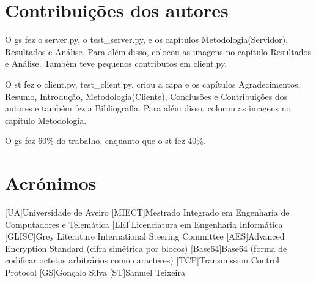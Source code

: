 \documentclass{report}
\begin{document}
\chapter*{Contribuições dos autores}
O \ac{gs} fez o server.py, o test\_server.py, e os capítulos Metodologia(Servidor), Resultados e Análise. Para além disso, colocou as imagens no capítulo Resultados e Análise. Também teve pequenos contributos em client.py.

O \ac{st} fez o client.py, test\_client.py, criou a capa e os capítulos Agradecimentos, Resumo, Introdução, Metodologia(Cliente), Conclusões e Contribuições dos autores e também fez a Bibliografia. Para além disso, colocou as imagens no capítulo Metodologia.

O \ac{gs} fez 60\% do trabalho, enquanto que o \ac{st} fez 40\%.
\chapter*{Acrónimos}
\begin{acronym}
[UA]{Universidade de Aveiro}
[MIECT]{Mestrado Integrado em Engenharia de Computadores e Telemática}
[LEI]{Licenciatura em Engenharia Informática}
[GLISC]{Grey Literature International Steering Committee}
[AES]{Advanced Encryption Standard (cifra simétrica por blocos)}
[Base64]{Base64 (forma de codificar octetos arbitrários como caracteres)}
[TCP]{Transmission Control Protocol}
[GS]{Gonçalo Silva}
[ST]{Samuel Teixeira}
\end{acronym}

\printbibliography
\end{document}
